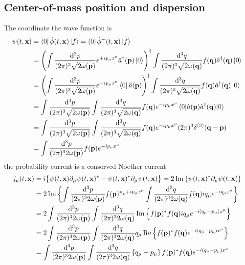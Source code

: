 \subsection{Center-of-mass position and dispersion}

The coordinate the wave function is
\begin{equation}
	\begin{split}
		\psi(t,\vb{x})
		&=
		\bra{0}
		\hat\phi(t,\vb{x})
		\ket{f}
		=
		\bra{0}
		\hat\phi^-(t,\vb{x})
		\ket{f}
		\\
		&=
		\left(
			\int\frac{\dd[3]{p}}{(2\pi)^3\sqrt{2\omega(\vb{p})}}
			e^{+ip_\mu x^\mu}
			\hat{a}^\dagger(\vb{p})
			\ket{0}
		\right)^\dagger
		\int\frac{\dd[3]{q}}{(2\pi)^3\sqrt{2\omega(\vb{q})}}
		f(\vb{q})
		\hat{a}^\dagger(\vb{q})
		\ket{0}
		\\
		&=
		\left(
			\int\frac{\dd[3]{p}}{(2\pi)^3\sqrt{2\omega(\vb{p})}}
			e^{-ip_\mu x^\mu}
			\bra{0}
			\hat{a}(\vb{p})
		\right)^\dagger
		\int\frac{\dd[3]{q}}{(2\pi)^3\sqrt{2\omega(\vb{q})}}
		f(\vb{q})
		\hat{a}^\dagger(\vb{q})
		\ket{0}
		\\
		&=
		\int\frac{\dd[3]{p}}{(2\pi)^3\sqrt{2\omega(\vb{p})}}
		\int\frac{\dd[3]{q}}{(2\pi)^3\sqrt{2\omega(\vb{q})}}
		f(\vb{q})
		e^{-ip_\mu x^\mu}
		\expval{\hat{a}(\vb{p})\hat{a}^\dagger(\vb{q})}{0}
		\\
		&=
		\int\frac{\dd[3]{p}}{(2\pi)^3\sqrt{2\omega(\vb{p})}}
		\int\frac{\dd[3]{q}}{(2\pi)^3\sqrt{2\omega(\vb{q})}}
		f(\vb{q})
		e^{-ip_\mu x^\mu}
		(2\pi)^3
		\delta^{(3)}(\vb{q}-\vb{p})
		\\
		&=
		\int\frac{\dd[3]{p}}{(2\pi)^32\omega(\vb{p})}
		f(\vb{p})
		e^{-ip_\mu x^\mu}
	\end{split}
\end{equation}
the probability current is a conserved Noether current~\cite[p.~18]{Peskin1995}
\begin{equation}
	\begin{split}
		j_\mu(t,\vb{x})
		&=
		i
		\bigl\{
			\psi(t,\vb{x})
			\partial_\mu
			\psi(t,\vb{x})^*
			-
			\psi(t,\vb{x})^*
			\partial_\mu
			\psi(t,\vb{x})
		\bigr\}
		=
		2
		\operatorname{\operatorname{Im}}\left\{
			\psi(t,\vb{x})^*
			\partial_\mu
			\psi(t,\vb{x})
		\right\}
		\\
		&=
		2
		\operatorname{\operatorname{Im}}\left\{
			\int\frac{\dd[3]{p}}{(2\pi)^32\omega(\vb{p})}
			f(\vb{p})^*e^{+ip_\mu x^\mu}
			\int\frac{\dd[3]{q}}{(2\pi)^32\omega(\vb{q})}
			f(\vb{q})iq_\mu e^{-iq_\mu x^\mu}
		\right\}
		\\
		&=
		2
		\int\frac{\dd[3]{p}}{(2\pi)^32\omega(\vb{p})}
		\int\frac{\dd[3]{q}}{(2\pi)^32\omega(\vb{q})}
		\operatorname{\operatorname{Im}}\left\{
			f(\vb{p})^*
			f(\vb{q})
			iq_\mu
			e^{-i(q_\mu-p_\mu)x^\mu}
		\right\}
		\\
		&=
		2
		\int\frac{\dd[3]{p}}{(2\pi)^32\omega(\vb{p})}
		\int\frac{\dd[3]{q}}{(2\pi)^32\omega(\vb{q})}
		q_\mu
		\operatorname{\operatorname{Re}}\left\{
			f(\vb{p})^*
			f(\vb{q})
			e^{-i(q_\mu-p_\mu)x^\mu}
		\right\}
		\\
		&=
		\int\frac{\dd[3]{p}}{(2\pi)^32\omega(\vb{p})}
		\int\frac{\dd[3]{q}}{(2\pi)^32\omega(\vb{q})}
		\left\{
			q_\mu
			+
			p_\mu
		\right\}
		f(\vb{p})^*
		f(\vb{q})
		e^{-i(q_\mu-p_\mu)x^\mu}
	\end{split}
\end{equation}
